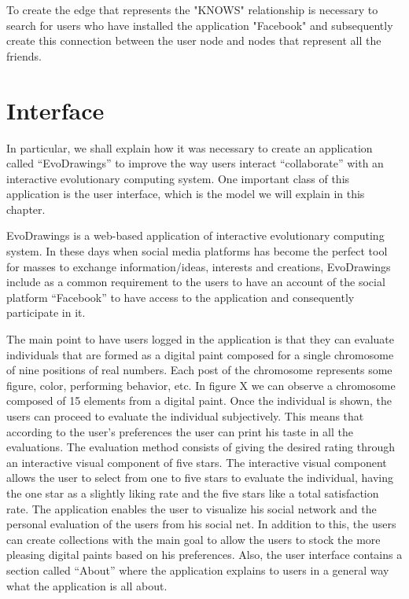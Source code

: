 To create the edge that represents the "KNOWS" relationship is necessary to
search for users who have installed the application "Facebook" and subsequently
create this connection between the user node and nodes that represent all the
friends.

\section{Interface}
In particular, we shall explain how it was necessary to create an application called “EvoDrawings” to improve the way users interact “collaborate” with an interactive evolutionary computing system. One important class of this application is the user interface, which is the model we will explain in this chapter.

EvoDrawings is a web-based application of interactive evolutionary computing system. In these days when social media platforms has become the perfect tool for masses to exchange information/ideas, interests and creations, EvoDrawings include as a common requirement to the users to have an account of the social platform “Facebook” to have access to the application and consequently participate in it.

The main point to have users logged in the application is that they can evaluate individuals that are formed as a digital paint composed for a single chromosome of nine positions of real numbers.
Each post of the chromosome represents some figure, color, performing behavior, etc. In figure X we can observe a chromosome composed of 15 elements from a digital paint. Once the individual is shown, the users can proceed to evaluate the individual subjectively. This means that according to the user's preferences the user can print his taste in all the evaluations.
The evaluation method consists of giving the desired rating through an interactive visual component of five stars. The interactive visual component allows the user to select from one to five stars to evaluate the individual, having the one star as a slightly liking rate and the five stars like a total satisfaction rate. 
The application enables the user to visualize his social network and the personal evaluation of the users from his social net. In addition to this, the users can create collections with the main goal to allow the users to stock the more pleasing digital paints based on his preferences. 
Also, the user interface contains a section called “About” where the application explains to users in a general way what the application is all about.



